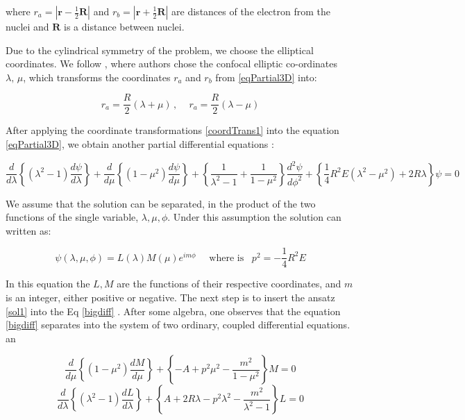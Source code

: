 where $ r_a = \left|\mathbf{r}-\frac{1}{2}\mathbf{R}\right| $ and $ r_b = \left|\mathbf{r}+\frac{1}{2}\mathbf{R}\right| $ are distances of the electron from the nuclei and $ \mathbf{R} $ is a distance between nuclei.

Due to the cylindrical symmetry of the problem, we choose the elliptical coordinates. We follow \cite{Bates1}, where authors chose the confocal elliptic co-ordinates $\lambda,\,\mu $, which transforms the coordinates $ r_a $ and $ r_ b $ from \eqref {eqPartial3D} into:

\begin{equation}\label{coordTrans1}
r_a = \frac{R}{2}(\lambda + \mu)\,,\,\,\,\,\,\,\,r_a = \frac{R}{2}(\lambda - \mu)
\end{equation}

After applying the coordinate transformations \eqref{coordTrans1} into the equation \eqref {eqPartial3D}, we obtain another partial differential equations \cite{Bates1}:

\begin{equation}\label{bigdiff}
\frac{d}{d\lambda}\left\{(\lambda^2-1)\frac{d\psi}{d\lambda}\right\} +\frac{d}{d\mu}\left\{(1-\mu^2)\frac{d\psi}{d\mu}\right\} + \left\{\frac{1}{\lambda^2-1} + \frac{1}{1-\mu^2} \right\}\frac{d^2\psi}{d\phi^2}+ \left\{\frac{1}{4}R^2E(\lambda^2 - \mu^2) + 2R\lambda \right\}\psi = 0
\end{equation}

We assume that the solution can be separated, in the product of the two functions of the single variable, $\lambda,\mu, \phi $. Under this assumption the solution can written as:

\begin{equation}\label{sol1}
\psi(\lambda, \mu, \phi) = L(\lambda)M(\mu)e^{im\phi}\,\,\,\,\,\,\text{ where is }\,\,\,p^2 = -\frac{1}{4}R^2E
\end{equation}

In this equation the $ L, M $ are the functions of their respective coordinates, and $ m $ is an integer, either positive or negative. The next step is to insert the ansatz \eqref{sol1} into the Eq \eqref{bigdiff} .  After some algebra, one observes that the equation \eqref{bigdiff} separates into the system of two ordinary, coupled differential equations.
an

\begin{equation}\label{m3d}
\frac{d}{d\mu}\left\{(1-\mu^2)\frac{dM}{d\mu}\right\} + \left\{-A + p^2\mu^2 -\frac{m^2}{1-\mu^2} \right\}M = 0 
\end{equation}
\begin{equation}\label{l3d}
\frac{d}{d\lambda}\left\{(\lambda^2-1)\frac{dL}{d\lambda}\right\} + \left\{A + 2R\lambda - p^2\lambda^2 -\frac{m^2}{\lambda^2-1} \right\}L = 0 
\end{equation}

